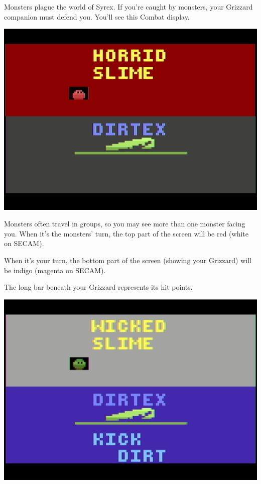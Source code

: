 \documentclass[10pt,twocolumn,openany,article]{memoir}
\begin{document}
Monsters plague the  world of Syrex. If you're caught  by monsters, your
Grizzard  companion must  defend  you. You'll  see  this Combat  display.

\begin{center}
  \includegraphics[width=\columnwidth]{../Manual/MonsterCombatNTSC.png}
\end{center}

Monsters often  travel in groups, so  you may see more  than one monster
facing you.  When it's the  monsters' turn, the  top part of  the screen
will be red (white on SECAM).

When  it's your  turn,  the  bottom part  of  the  screen (showing  your
Grizzard) will be indigo (magenta on SECAM). 

The long bar beneath your Grizzard represents its hit points.

\begin{center}
  \includegraphics[width=\columnwidth]{../Manual/GrizzardCombatNTSC.png}
\end{center}
\end{document}
